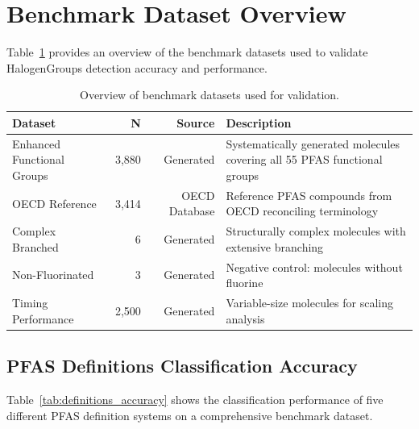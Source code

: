 

\section*{Benchmark Dataset Overview}

Table~\ref{tab:datasets} provides an overview of the benchmark datasets used to validate HalogenGroups detection accuracy and performance.

\begin{table}[htbp]
\centering
\caption{Overview of benchmark datasets used for validation.}
\label{tab:datasets}
\begin{tabular}{lrrp{6cm}}
\toprule
\rowcolor[HTML]{D6E4F5}\textbf{Dataset} & \textbf{N} & \textbf{Source} & \textbf{Description} \\
\midrule
Enhanced Functional Groups & 3,880 & Generated & Systematically generated molecules covering all 55 PFAS functional groups \\
OECD Reference & 3,414 & OECD Database & Reference PFAS compounds from OECD reconciling terminology \\
Complex Branched & 6 & Generated & Structurally complex molecules with extensive branching \\
Non-Fluorinated & 3 & Generated & Negative control: molecules without fluorine \\
Timing Performance & 2,500 & Generated & Variable-size molecules for scaling analysis \\
\bottomrule
\end{tabular}
\end{table}

\subsection*{PFAS Definitions Classification Accuracy}

Table~\ref{tab:definitions_accuracy} shows the classification performance of five different PFAS definition systems on a comprehensive benchmark dataset.

